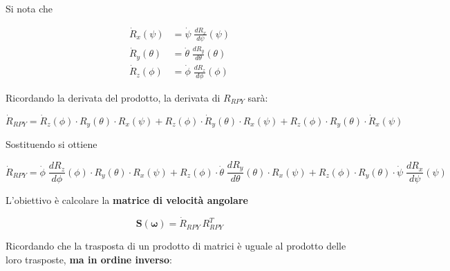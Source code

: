 \documentclass[11pt, a4paper]{article}
\begin{document}
\vspace{1em}
\begin{par}
\begin{flushleft}
Si nota che
\end{flushleft}
\end{par}

\[
\begin{aligned}
    \dot{R}_x (\psi ) &= \dot{\psi} \;\frac{dR_x}{d\psi} (\psi )\\
    \dot{R}_y (\theta ) &= \dot{\theta} \;\frac{dR_y}{d\theta} (\theta )\\
    \dot{R}_z (\phi ) &= \dot{\phi} \;\frac{dR_z}{d\phi} (\phi )
\end{aligned}
\]

\newpage
{}

\begin{par}
\begin{flushleft}
Ricordando la derivata del prodotto, la derivata di $R_{RPY}$ sarà:
\end{flushleft}
\end{par}
\[
    \dot{R}_{RPY} = \dot{R}_z(\phi) \cdot R_y(\theta) \cdot R_x(\psi) + R_z(\phi) \cdot \dot{R}_y(\theta) \cdot R_x(\psi) + R_z(\phi) \cdot R_y(\theta) \cdot \dot{R}_x(\psi)
\]

\begin{par}
\begin{flushleft}
Sostituendo si ottiene
\end{flushleft}
\end{par}

\[
    \dot{R}_{RPY} =\dot{\phi} \;\frac{dR_z}{d\phi} (\phi )\cdot R_y (\theta )\cdot R_x (\psi )+R_z (\phi )\cdot \dot{\theta} \;\frac{dR_y}{d\theta} (\theta )\cdot R_x (\psi )+R_z (\phi )\cdot R_y (\theta )\cdot \dot{\psi} \;\frac{dR_x}{d\psi} (\psi )
\]
\begin{par}
\begin{flushleft}
L'obiettivo è calcolare la \textbf{matrice di velocità angolare}
\end{flushleft}
\end{par}

\[
    \mathbf{S}(\boldsymbol{\omega}) = \dot{R}_{RPY} \, R_{RPY}^T
\]

\begin{par}
\begin{flushleft}
Ricordando che la trasposta di un prodotto di matrici è uguale al prodotto delle loro trasposte, \textbf{ma in ordine inverso}:
\end{flushleft}
\end{par}
\end{document}
